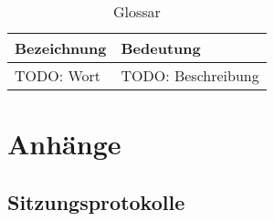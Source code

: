 \begin{table}[H]
    \begin{tabular}{|L{0.3\textwidth}|L{0.6\textwidth}|}
        \hline
         \textbf{\color{white}Bezeichnung} & \textbf{\color{white}Bedeutung} \\[12pt]
        \hline
        TODO: Wort & TODO: Beschreibung \\
        \hline
    \end{tabular}
    \caption{Glossar}
\end{table}

\chapter{Anhänge}

\section{Sitzungsprotokolle}







